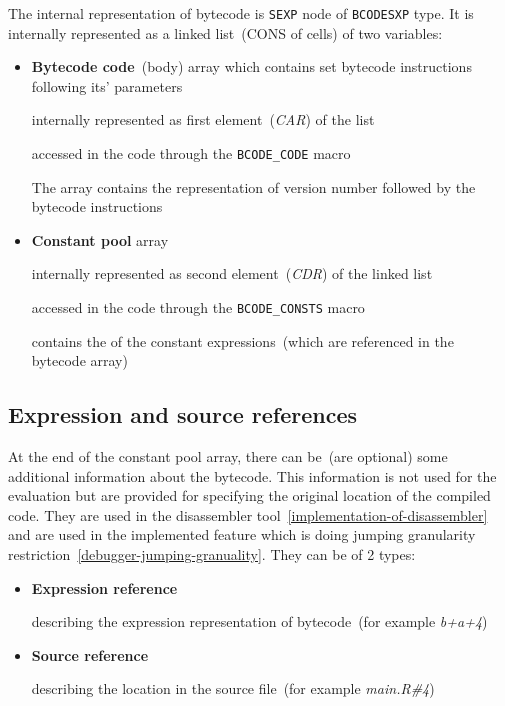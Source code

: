 \documentclass[thesis=M,english]{FITthesis}[2018/10/20]
\newcommand{\code}[1]{\texttt{#1}}
\begin{document}
The internal representation of bytecode is \code{SEXP} node of \code{BCODESXP} type. It is internally represented as a linked list~(CONS of cells) of two variables:
\begin{itemize}
	\item \textbf{Bytecode code}~(body) array which contains set bytecode instructions following its' parameters

		\hspace*{6mm} internally represented as first element~(\textit{CAR}) of the list

		\hspace*{6mm} accessed in the code through the \code{BCODE{\_}CODE} macro

		\hspace*{6mm} The array contains the representation of version number followed by the bytecode instructions

	\item \textbf{Constant pool} array

		\hspace*{6mm} internally represented as second element~(\textit{CDR}) of the linked list

		\hspace*{6mm} accessed in the code through the \code{BCODE{\_}CONSTS} macro

		\hspace*{6mm} contains the of the constant expressions~(which are referenced in the bytecode array)

\end{itemize}

\subsection{Expression and source references}\label{Exprref-and-srcref}

At the end of the constant pool array, there can be~(are optional) some additional information about the bytecode. This information is not used for the evaluation but are provided for specifying the original location of the compiled code. They are used in the disassembler tool~\ref{implementation-of-disassembler} and are used in the implemented feature which is doing jumping granularity restriction~\ref{debugger-jumping-granuality}. They can be of 2 types:

\begin{itemize}
	\item \textbf{Expression reference}

describing the expression representation of bytecode~(for example \textit{b+a+4})

	\item \textbf{Source reference}

describing the location in the source file~(for example \textit{main.R{\#}4})
\end{itemize}
\end{document}
